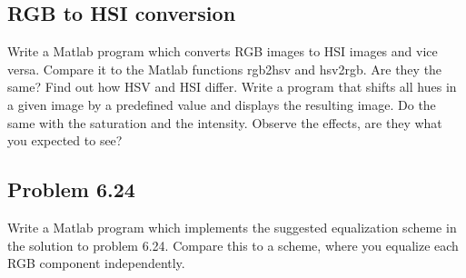 \subsection{RGB to HSI conversion}
Write a Matlab program which converts RGB images to HSI images and vice versa.
Compare it to the Matlab functions rgb2hsv and hsv2rgb. Are they the same?  Find out how HSV and HSI differ. Write a program that shifts all hues in a given image by a predefined value and displays the resulting image. Do the same with the saturation and the intensity. Observe the effects, are they what you expected to see?
\subsection{Problem 6.24}
Write a Matlab program which implements the suggested equalization scheme in the
solution to problem 6.24.  Compare this to a scheme, where you equalize each RGB component independently.
